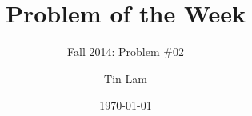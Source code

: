 
\title{\vspace*{-15pt}\Large Problem of the Week}
\subtitle{\vspace*{-3pt}Fall 2014: Problem \#02}
\subject{Purdue University}
\date{\vspace*{-10pt} \today}
\author{Tin Lam}